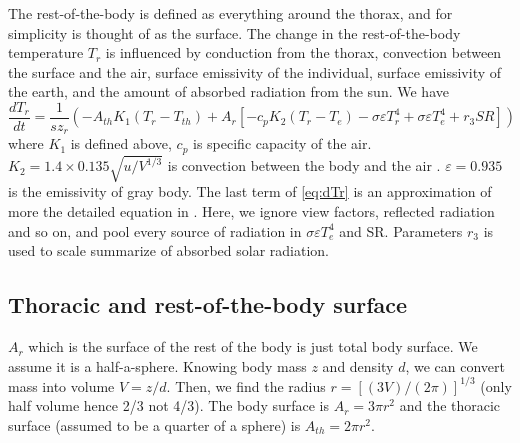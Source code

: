 \documentclass[12pt]{article}
\begin{document}
The rest-of-the-body is defined as everything around the thorax, and for simplicity is thought of as the surface.
The change in the rest-of-the-body temperature $T_r$ is influenced by conduction from the thorax, convection between the surface and the air, surface emissivity of the individual, surface emissivity of the earth, and the amount of absorbed radiation from the sun.
We have
\begin{equation} \label{eq:dTr}
	\frac{dT_{r}}{dt} = \frac{1}{s z_{r}} \left( - A_{th} K_1(T_r - T_{th}) + A_r \left[ - c_p K_2 (T_r- T_e) - \sigma \varepsilon T_r^4 + \sigma \varepsilon T_e^4  + r_3 SR  \right] \right)
\end{equation}
where $K_1$ is defined above, $c_p$ is specific capacity of the air. 
$K_2 =  1.4 \times 0.135 \sqrt{u/V^{1/3}}$ is convection between the body and the air \citep{Campbell2012}.
$\varepsilon = 0.935$  is the emissivity of gray body.
The last term of \cref{eq:dTr} is an approximation of more the detailed equation in \citet{Campbell2012}.
Here, we ignore view factors, reflected radiation and so on, and pool every source of radiation in $ \sigma \varepsilon T_e^4$ and SR. 
Parameters $r_3$ is used to scale summarize of absorbed solar radiation.

\subsection*{Thoracic and rest-of-the-body surface}
$A_r$ which is the surface of the rest of the body is just total body surface.
We assume it is a half-a-sphere.
Knowing body mass $z$ and density $d$, we can convert mass into volume $ V = z/d$.
Then, we find the radius $r = [(3V)/(2 \pi)]^{1/3}$ (only half volume hence 2/3 not 4/3).
The body surface is   $A_r = 3 \pi r^2$ and the thoracic surface (assumed to be a quarter of a sphere) is $A_{th} = 2 \pi r^2$. 


\end{document}
